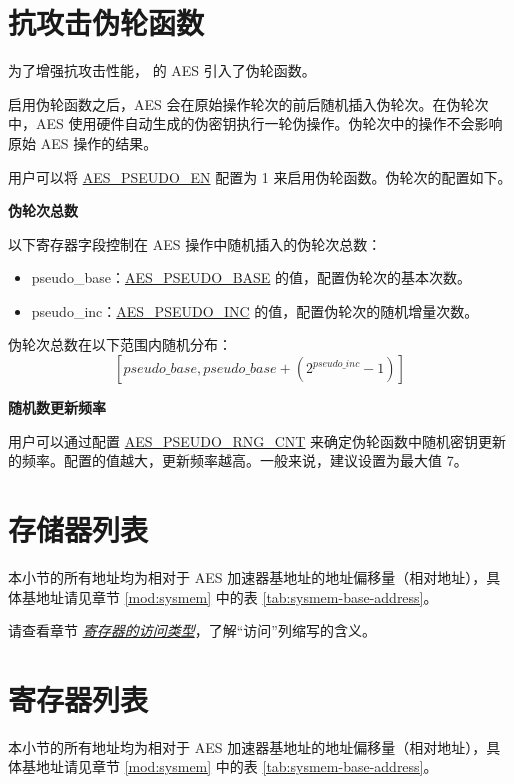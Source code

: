\documentclass[main\_\_CN.tex]{subfiles}
\begin{document}
\section{抗攻击伪轮函数}\label{sec:aes-pseudo-round}

为了增强抗攻击性能，\chipname{} 的 AES 引入了伪轮函数。

启用伪轮函数之后，AES 会在原始操作轮次的前后随机插入伪轮次。在伪轮次中，AES 使用硬件自动生成的伪密钥执行一轮伪操作。伪轮次中的操作不会影响原始 AES 操作的结果。

用户可以将 \hyperref[fielddesc:AESPSEUDOEN]{AES\_PSEUDO\_EN} 配置为 1 来启用伪轮函数。伪轮次的配置如下。

\textbf{伪轮次总数}

以下寄存器字段控制在 AES 操作中随机插入的伪轮次总数：
\begin{itemize}
    \item pseudo\_base：\hyperref[fielddesc:AESPSEUDOBASE]{AES\_PSEUDO\_BASE} 的值，配置伪轮次的基本次数。
    \item pseudo\_inc：\hyperref[fielddesc:AESPSEUDOINC]{AES\_PSEUDO\_INC} 的值，配置伪轮次的随机增量次数。
\end{itemize}

伪轮次总数在以下范围内随机分布：$$[pseudo\_base,pseudo\_base+(2^{pseudo\_inc}-1)]$$

\textbf{随机数更新频率}

用户可以通过配置 \hyperref[fielddesc:AESPSEUDORNGCNT]{AES\_PSEUDO\_RNG\_CNT} 来确定伪轮函数中随机密钥更新的频率。配置的值越大，更新频率越高。一般来说，建议设置为最大值 7。


\section{存储器列表}

本小节的所有地址均为相对于 AES 加速器基地址的地址偏移量（相对地址），具体基地址请见章节 \ref{mod:sysmem} \textit{} 中的表 \ref{tab:sysmem-base-address}。

请查看章节 \hyperref[glossary-access-types]{\textit{寄存器的访问类型}}，了解“访问”列缩写的含义。



\hypertarget{aes-reg-summ}{}
\section{寄存器列表}

本小节的所有地址均为相对于 AES 加速器基地址的地址偏移量（相对地址），具体基地址请见章节 \ref{mod:sysmem} \textit{} 中的表 \ref{tab:sysmem-base-address}。
\end{document}
